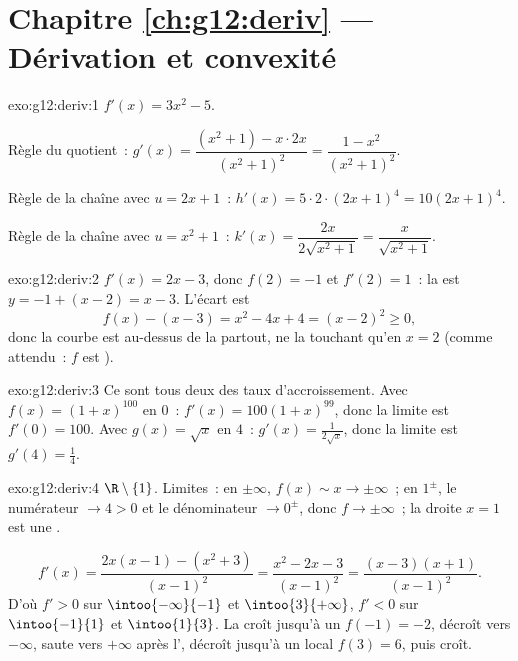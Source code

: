 \section*{Chapitre \ref{ch:g12:deriv} --- Dérivation et convexité}

\begin{solution}{exo:g12:deriv:1}
$f'(x) = 3x^2 - 5$.

Règle du quotient~:
$g'(x) = \dfrac{(x^2+1) - x\cdot 2x}{(x^2+1)^2} = \dfrac{1 - x^2}{(x^2+1)^2}$.

Règle de la chaîne avec $u = 2x+1$~: $h'(x) = 5 \cdot 2 \cdot (2x+1)^4 = 10(2x+1)^4$.

Règle de la chaîne avec $u = x^2 + 1$~:
$k'(x) = \dfrac{2x}{2\sqrt{x^2+1}} = \dfrac{x}{\sqrt{x^2+1}}$.
\end{solution}

\begin{solution}{exo:g12:deriv:2}
$f'(x) = 2x - 3$, donc $f(2) = -1$ et $f'(2) = 1$~: la  est
$y = -1 + (x - 2) = x - 3$. L'écart est
\[
f(x) - (x - 3) = x^2 - 4x + 4 = (x-2)^2 \geq 0 ,
\]
donc la courbe est au-dessus de la  partout, ne la touchant qu'en
$x = 2$ (comme attendu~: $f$ est ).
\end{solution}

\begin{solution}{exo:g12:deriv:3}
Ce sont tous deux des taux d'accroissement. Avec $f(x) = (1+x)^{100}$ en
$0$~: $f'(x) = 100(1+x)^{99}$, donc la limite est $f'(0) = 100$.
Avec $g(x) = \sqrt{x}$ en $4$~: $g'(x) = \frac{1}{2\sqrt{x}}$, donc la
limite est $g'(4) = \frac14$.
\end{solution}

\begin{solution}{exo:g12:deriv:4}
 $\R \setminus \{1\}$. Limites~: en $\pm\infty$,
$f(x) \sim x \to \pm\infty$~; en $1^\pm$, le numérateur $\to 4 > 0$ et le
dénominateur $\to 0^\pm$, donc $f \to \pm\infty$~; la droite $x = 1$ est
une .

\[
f'(x) = \frac{2x(x-1) - (x^2+3)}{(x-1)^2} = \frac{x^2 - 2x - 3}{(x-1)^2}
= \frac{(x-3)(x+1)}{(x-1)^2}.
\]
D'où $f' > 0$ sur $\intoo{-\infty}{-1}$ et $\intoo{3}{+\infty}$,
$f' < 0$ sur $\intoo{-1}{1}$ et $\intoo{1}{3}$. La  croît jusqu'à
un  $f(-1) = -2$, décroît vers $-\infty$, saute vers
$+\infty$ après l', décroît jusqu'à un  local
$f(3) = 6$, puis croît.
\end{solution}

